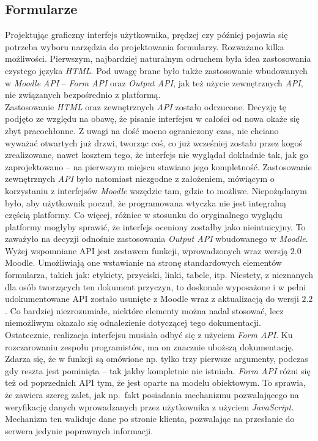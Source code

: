 \subsection{Formularze}
\label{Chapter625}

Projektując graficzny interfejs użytkownika, prędzej czy później pojawia się potrzeba wyboru narzędzia do projektowania formularzy. Rozważano kilka możliwości. Pierwszym, najbardziej naturalnym odruchem była idea zastosowania czystego języka \textit{HTML}. Pod uwagę brane było także zastosowanie wbudowanych w \textit{Moodle} \textit{API} -- \textit{Form API} oraz \textit{Output API}, jak też użycie zewnętrznych \textit{API}, nie związanych bezpośrednio z platformą. \\

Zastosowanie \textit{HTML} oraz zewnętrznych \textit{API} zostało odrzucone. Decyzję tę podjęto ze względu na obawę, że pisanie interfejsu w całości od nowa okaże się zbyt pracochłonne. Z uwagi na dość mocno ograniczony czas, nie chciano wyważać otwartych już drzwi, tworząc coś, co już wcześniej zostało przez kogoś zrealizowane, nawet kosztem tego, że interfejs nie wyglądał dokładnie tak, jak go zaprojektowano -- na pierwszym miejscu stawiano jego kompletność. Zastosowanie zewnętrznych \textit{API} było natomiast niezgodne z założeniem, mówiącym o korzystaniu z interfejsów \textit{Moodle} wszędzie tam, gdzie to możliwe. Niepożądanym było, aby użytkownik poczuł, że programowana wtyczka nie jest integralną częścią platformy. Co więcej, różnice w stosunku do oryginalnego wyglądu platformy mogłyby sprawić, że interfejs oceniony zostałby jako nieintuicyjny. To zaważyło na decyzji odnośnie zastosowania \textit{Output API} wbudowanego w \textit{Moodle}. \\

Wyżej wspomniane API jest zestawem funkcji, wprowadzonych wraz wersją $2.0$ Moodle. Umożliwiają one wstawianie na stronę standardowych elementów formularza, takich jak: etykiety, przyciski, linki, tabele, itp. Niestety, z nieznanych dla osób tworzących ten dokument przyczyn, to doskonale wyposażone i w pełni udokumentowane API zostało usunięte z Moodle wraz z aktualizacją do wersji $2.2$. Co bardziej niezrozumiałe, niektóre elementy można nadal stosować, lecz niemożliwym okazało się odnalezienie dotyczącej tego dokumentacji. \\

Ostatecznie, realizacja interfejsu musiała odbyć się z użyciem \textit{Form API}. Ku rozczarowaniu zespołu programistów, ma on znacznie uboższą dokumentację. Zdarza się, że w funkcji są omówione np. tylko trzy pierwsze argumenty, podczas gdy reszta jest pominięta -- tak jakby kompletnie nie istniała. \textit{Form API} różni się też od poprzednich API tym, że jest oparte na modelu obiektowym. To sprawia, że zawiera szereg zalet, jak np.~fakt posiadania mechanizmu pozwalającego na weryfikację danych wprowadzanych przez użytkownika z użyciem \textit{JavaScript}. Mechanizm ten waliduje dane po stronie klienta, pozwalając na przesłanie do serwera jedynie poprawnych informacji. \\

